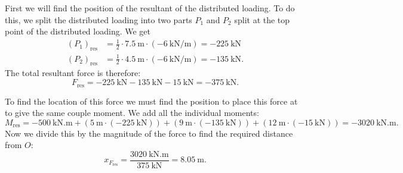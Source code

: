 \begin{derivation}
  First we will find the position of the resultant of the distributed loading.
  To do this, we split the distributed loading into two parts $P_1$ and $P_2$ split at the top point of the distributed loading.
  We get
  \begin{align*}
    \left( P_1 \right)_{\mathrm{res}} &= \frac{1}{2}\cdot \qty{7.5}{\m} \cdot \left( - \qty{6}{\kN\per\m} \right) = - \qty{225}{\kN} \\
    \left( P_2 \right)_{\mathrm{res}} &= \frac{1}{2} \cdot \qty{4,5}{\m} \cdot \left( - \qty{6}{\kN\per\m}  \right) = -\qty{135}{\kN} 
  .\end{align*}
  The total resultant force is therefore:
  \begin{equation*}
    F_{\mathrm{res}} = -\qty{225}{\kN} - \qty{135}{\kN} - \qty{15}{\kN}  = \qty{-375}{\kN}
  .\end{equation*}
  
  To find the location of this force we must find the position to place this force at to give the same couple moment. 
  We add all the individual moments:
  \begin{equation*}
    M_{\mathrm{res}} = -\qty{500}{\kN.\m} + \left( \qty{5}{\m} \cdot (- \qty{225}{\kN})  \right) + \left( \qty{9}{\m} \cdot (-\qty{135}{\kN})  \right) + \left( \qty{12}{\m} \cdot(- \qty{15}{\kN})  \right) = -\qty{3020}{\kN.\m} 
  .\end{equation*}
  Now we divide this by the magnitude of the force to find the required distance from $O$:
  \begin{equation*}
    x_{F_{\mathrm{res}}} = \frac{\qty{3020}{\kN.\m} }{\qty{375}{\kN} } = \qty{8.05}{\meter}
  .\end{equation*}
\end{derivation}

